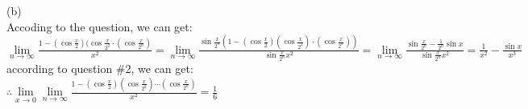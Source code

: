 \documentclass{article}
\begin{document}
(b)\\

Accoding to the question, we can get:\\

$\lim \limits_{n \to \infty}\displaystyle\frac{1-(\cos\frac{x}{2})(\cos\frac{x}{2^2}\cdot(\cos\frac{x}{2^n})}{x^2}=
\lim \limits_{n \to \infty}\displaystyle\frac{\sin\frac{x}{2^n}\left(1-(\cos\frac{x}{2})(\cos\frac{x}{2^2})\cdot(\cos\frac{x}{2^n})\right)}{\sin\frac{x}{2^n}x^2}
=\lim \limits_{n \to \infty}\frac{\sin\frac{x}{2^n}-\frac{1}{2^n}\sin x}{\sin\frac{x}{2^n}x^2}=\frac{1}{x^2}-\frac{\sin x}{x^3}$\\

according to question \#2, we can get:\\ 

$\therefore$\qquad$\lim \limits_{x \to 0}\lim \limits_{n \to \infty}\displaystyle\frac{1-(\cos\frac{x}{2})(\cos\frac{x}{2^2})\cdots(\cos\frac{x}{2^n})}{x^2}=\frac{1}{6}$\\
\end{document}
